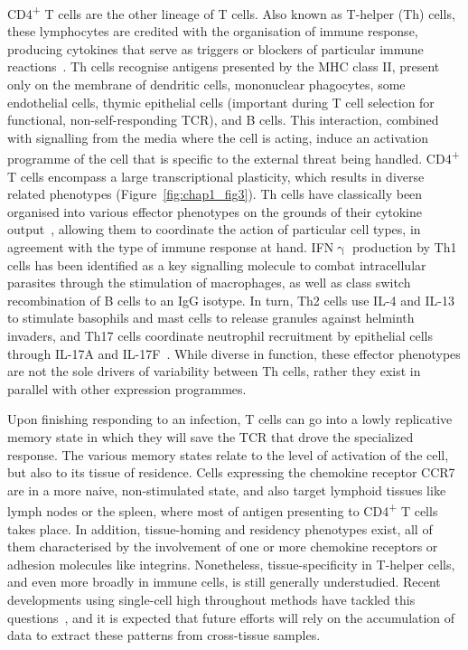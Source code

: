 CD4\textsuperscript{+} T cells are the other lineage of T cells. Also known as T-helper (Th) cells, these lymphocytes are credited with the organisation of immune response, producing cytokines that serve as triggers or blockers of particular immune reactions~\citep{luckheeram_cd4+t_2012}. Th cells recognise antigens presented by the MHC class II, present only on the membrane of dendritic cells, mononuclear phagocytes, some endothelial cells, thymic epithelial cells (important during T cell selection for functional, non-self-responding TCR), and B cells. This interaction, combined with signalling from the media where the cell is acting, induce an activation programme of the cell that is specific to the external threat being handled. CD4\textsuperscript{+} T cells encompass a large transcriptional plasticity, which results in diverse related phenotypes (Figure~\ref{fig:chap1_fig3}). Th cells have classically been organised into various effector phenotypes on the grounds of their cytokine output~\citep{mosmann_two_1986,schmitt_regulation_2015}, allowing them to coordinate the action of particular cell types, in agreement with the type of immune response at hand. IFN${\upgamma}$ production by Th1 cells has been identified as a key signalling molecule to combat intracellular parasites through the stimulation of macrophages, as well as class switch recombination of B cells to an IgG isotype. In turn, Th2 cells use IL-4 and IL-13 to stimulate basophils and mast cells to release granules against helminth invaders, and Th17 cells coordinate neutrophil recruitment by epithelial cells through IL-17A and IL-17F~\citep{weaver_th17_2013}. While diverse in function, these effector phenotypes are not the sole drivers of variability between Th cells, rather they exist in parallel with other expression programmes. 

Upon finishing responding to an infection, T cells can go into a lowly replicative memory state in which they will save the TCR that drove the specialized response. The various memory states relate to the level of activation of the cell, but also to its tissue of residence. Cells expressing the chemokine receptor CCR7 are in a more naive, non-stimulated state, and also target lymphoid tissues like lymph nodes or the spleen, where most of antigen presenting to CD4\textsuperscript{+} T cells takes place. In addition, tissue-homing and residency phenotypes exist, all of them characterised by the involvement of one or more chemokine receptors or adhesion molecules like integrins. Nonetheless, tissue-specificity in T-helper cells, and even more broadly in immune cells, is still generally understudied. Recent developments using single-cell high throughout methods have tackled this questions~\citep{wong_high-dimensional_2016,scott_transcription_2018}, and it is expected that future efforts will rely on the accumulation of data to extract these patterns from cross-tissue samples.


